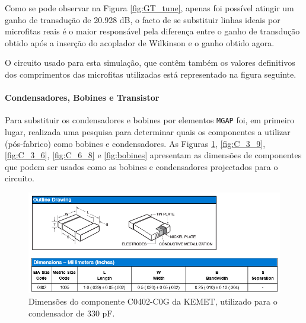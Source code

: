 \documentclass[11pt]{article}
\numberwithin{equation}{section}
\begin{document}
Como se pode observar na Figura \ref{fig:GT_tune}, apenas foi possível atingir um ganho de transdução de 20.928 dB, o facto de se substituir linhas ideais por microfitas reais é o maior responsável pela diferença entre o ganho de transdução obtido após a inserção do acoplador de Wilkinson e o ganho obtido agora.

O circuito usado para esta simulação, que contêm também os valores definitivos dos comprimentos das microfitas utilizadas está representado na figura seguinte.

\pagebreak


\paragraph{Condensadores, Bobines e Transistor} \hspace{0pt} 

Para substituir os condensadores e bobines por elementos \texttt{MGAP} foi, em primeiro lugar, realizada uma pesquisa para determinar quais os componentes a utilizar (pós-fabrico) como bobines e condensadores. As Figuras \ref{fig:C_330}, \ref{fig:C_3_9}, \ref{fig:C_3_6}, \ref{fig:C_6_8} e \ref{fig:bobines} apresentam as dimensões de componentes que podem ser usados como as bobines e condensadores projectados para o circuito.

\begin{figure}[H]
\centering
\includegraphics[keepaspectratio=true, scale=0.45]{teoricas/330pF}
\vspace{-0.5em}
\caption{Dimensões do componente C0402-C0G da KEMET, utilizado para o condensador de 330 pF.}
\vspace{-0.8em}
\label{fig:C_330}
\end{figure}
\end{document}
